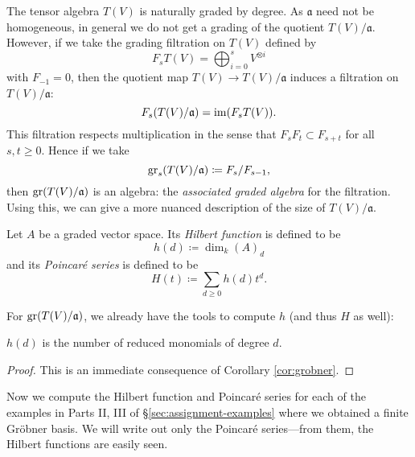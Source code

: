 The tensor algebra $T(V)$ is naturally graded by degree. As $\mathfrak{a}$ need not be homogeneous, in general we do not get a grading of the quotient $T(V)/\mathfrak{a}$. However, if we take the grading filtration on $T(V)$ defined by
\[
	F_s T(V) = \bigoplus_{i=0}^s V^{\otimes i}
\]
with $F_{-1} = 0$, then the quotient map $T(V) \to T(V)/\mathfrak{a}$ induces a filtration on $T(V)/\mathfrak{a}$:
\[
	F_s(T(V)/\mathfrak{a}) = \operatorname{im} (F_s T(V)).
\]
This filtration respects multiplication in the sense that $F_s F_t \subset F_{s+t}$ for all $s,t \geq 0$. Hence if we take
\[
	\operatorname{gr}_s(T(V)/\mathfrak{a}) \coloneqq F_s/F_{s-1},
\]
then $\operatorname{gr} (T(V)/\mathfrak{a})$ is an algebra: the \emph{associated graded algebra} for the filtration. Using this, we can give a more nuanced description of the size of $T(V)/\mathfrak{a}$.
\begin{defn}
	Let $A$ be a graded vector space. Its \emph{Hilbert function} is defined to be
	\[
		h(d) \coloneqq \dim_k (A)_d
	\]
	and its \emph{Poincar\'e series} is defined to be
	\[
		H(t) \coloneqq \sum_{d\geq 0} h(d) t^d.
	\]
\end{defn}
For $\operatorname{gr} (T(V) / \mathfrak{a})$, we already have the tools to compute $h$ (and thus $H$ as well):
\begin{lem}
	$h(d)$ is the number of reduced monomials of degree $d$.
\end{lem}
\begin{proof}
	This is an immediate consequence of Corollary \ref{cor:grobner}.
\end{proof}
Now we compute the Hilbert function and Poincar\'e series for each of the examples in Parts II, III of \S\ref{sec:assignment-examples} where we obtained a finite Gr\"obner basis. We will write out only the Poincar\'e series---from them, the Hilbert functions are easily seen.
